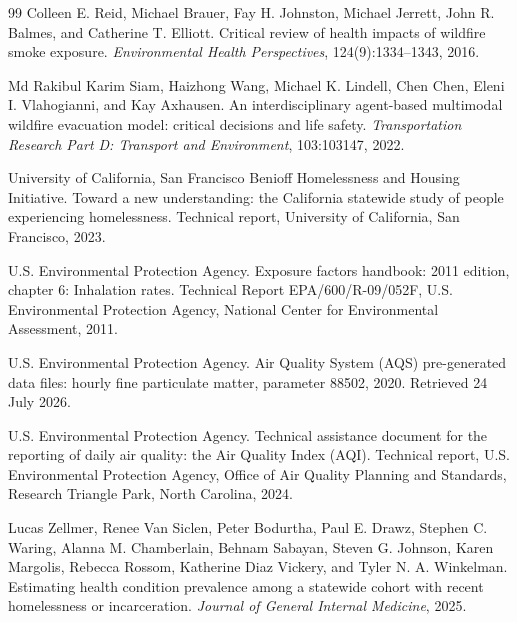 \documentclass[graybox]{svmult}
\begin{document}
\begin{thebibliography}{99}
Colleen E. Reid, Michael Brauer, Fay H. Johnston, Michael Jerrett, John R.
Balmes, and Catherine T. Elliott. Critical review of health impacts of wildfire
smoke exposure. \emph{Environmental Health Perspectives}, 124(9):1334--1343,
2016.

Md Rakibul Karim Siam, Haizhong Wang, Michael K. Lindell, Chen Chen, Eleni I.
Vlahogianni, and Kay Axhausen. An interdisciplinary agent-based multimodal
wildfire evacuation model: critical decisions and life safety.
\emph{Transportation Research Part D: Transport and Environment}, 103:103147,
2022.

University of California, San Francisco Benioff Homelessness and Housing
Initiative. Toward a new understanding: the California statewide study of people
experiencing homelessness. Technical report, University of California, San
Francisco, 2023.

U.S. Environmental Protection Agency. Exposure factors handbook: 2011 edition,
chapter 6: Inhalation rates. Technical Report EPA/600/R-09/052F, U.S.
Environmental Protection Agency, National Center for Environmental Assessment,
2011.

U.S. Environmental Protection Agency. Air Quality System (AQS) pre-generated data
files: hourly fine particulate matter, parameter 88502, 2020. Retrieved 24 July
2026.

U.S. Environmental Protection Agency. Technical assistance document for the
reporting of daily air quality: the Air Quality Index (AQI). Technical report,
U.S. Environmental Protection Agency, Office of Air Quality Planning and
Standards, Research Triangle Park, North Carolina, 2024.

Lucas Zellmer, Renee Van Siclen, Peter Bodurtha, Paul E. Drawz, Stephen C.
Waring, Alanna M. Chamberlain, Behnam Sabayan, Steven G. Johnson, Karen Margolis,
Rebecca Rossom, Katherine Diaz Vickery, and Tyler N. A. Winkelman. Estimating
health condition prevalence among a statewide cohort with recent homelessness or
incarceration. \emph{Journal of General Internal Medicine}, 2025.

\end{thebibliography}
\end{document}
